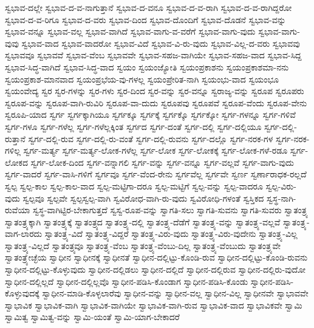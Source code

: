 {ಸ್ವಭಾವ-ದಲ್ಲೇ
ಸ್ವಭಾವ-ದ-ವ-ನಾಗುತ್ತಾನೆ
ಸ್ವಭಾವ-ದ-ವನೂ
ಸ್ವಭಾವ-ದ-ವ-ರಾಗಿ
ಸ್ವಭಾವ-ದ-ವ-ರಾಗಿದ್ದರೋ
ಸ್ವಭಾವ-ದ-ವ-ರಿಗೂ
ಸ್ವಭಾವ-ದ-ವರು
ಸ್ವಭಾವ-ದಿಂದ
ಸ್ವಭಾವ-ದೊಂದಿಗೆ
ಸ್ವಭಾವ-ದೊಡನೆ
ಸ್ವಭಾವ-ವನ್ನು
ಸ್ವಭಾವ-ವನ್ನೂ
ಸ್ವಭಾವ-ವಲ್ಲ
ಸ್ವಭಾವ-ವಾಗಿದೆ
ಸ್ವಭಾವ-ವಾಗು-ವ-ವರೆಗೆ
ಸ್ವಭಾವ-ವಾಗು-ವುದು
ಸ್ವಭಾವ-ವಾಗು-ವುವು
ಸ್ವಭಾವ-ವಾದ
ಸ್ವಭಾವ-ವಾದರೋ
ಸ್ವಭಾವ-ವಿದೆ
ಸ್ವಭಾವ-ವಿ-ರು-ವುದು
ಸ್ವಭಾವ-ವಿಲ್ಲ-ದ-ವರು
ಸ್ವಭಾವವು
ಸ್ವಭಾವವೂ
ಸ್ವಭಾವವೆ
ಸ್ವಭಾವ-ವೆಂಬ
ಸ್ವಭಾವವೇ
ಸ್ವಭಾವ-ಸಹಜ-ವಾಗಿಯೇ
ಸ್ವಭಾವ-ಸಹಜ-ವಾದ
ಸ್ವಭಾವ-ಸಿದ್ದ
ಸ್ವಭಾವ-ಸಿದ್ಧ-ವಾಗಿದೆ
ಸ್ವಭಾವ-ಸಿದ್ಧ-ವಾದ
ಸ್ವಯಂ
ಸ್ವಯಂಜ್ಯೋತಿ
ಸ್ವಯಂಪ್ರಕಾಶನು
ಸ್ವಯಂಪ್ರಕಾಶಮಾ-ನನು
ಸ್ವಯಂಪ್ರಕಾಶ-ಮಾನವಾದ
ಸ್ವಯಂಪ್ರಭೆಯ-ವು-ಗಳಲ್ಲ
ಸ್ವಯಂಪ್ರೇರಿತ-ನಾಗಿ
ಸ್ವಯಂಭು-ವಾದ
ಸ್ವಯಂಭೂ
ಸ್ವಯಂವೇದ್ಯ
ಸ್ವರ
ಸ್ವರ-ಗಳನ್ನು
ಸ್ವರ-ಗಳು
ಸ್ವರ-ದಿಂದ
ಸ್ವರ-ವನ್ನು
ಸ್ವರ-ವನ್ನೂ
ಸ್ವರಾಜ್ಯ-ವನ್ನು
ಸ್ವರೂಪ
ಸ್ವರೂಪರು
ಸ್ವರೂಪ-ವನ್ನು
ಸ್ವರೂಪ-ವಾಗಿ-ರುವಿರಿ
ಸ್ವರೂಪ-ವಾ-ದುದು
ಸ್ವರೂಪವು
ಸ್ವರೂಪವೆ
ಸ್ವರೂಪ-ವೆಂದು
ಸ್ವರೂಪ-ವೇನು
ಸ್ವರೂಪಿ-ಯಾದ
ಸ್ವರ್ಗ
ಸ್ವರ್ಗಕ್ಕಾಗಿಯೂ
ಸ್ವರ್ಗಕ್ಕೂ
ಸ್ವರ್ಗಕ್ಕೆ
ಸ್ವರ್ಗಕ್ಕೊ
ಸ್ವರ್ಗಕ್ಕೋ
ಸ್ವರ್ಗ-ಗಳನ್ನೂ
ಸ್ವರ್ಗ-ಗಳಿವೆ
ಸ್ವರ್ಗ-ಗಳೂ
ಸ್ವರ್ಗ-ಗಳೆಲ್ಲ
ಸ್ವರ್ಗ-ಗಳೆಲ್ಲಕ್ಕಿಂತ
ಸ್ವರ್ಗದ
ಸ್ವರ್ಗ-ದಂತೆ
ಸ್ವರ್ಗ-ದಲ್ಲಿ
ಸ್ವರ್ಗ-ದಲ್ಲಿಯೂ
ಸ್ವರ್ಗ-ದಲ್ಲಿ-ರುತ್ತಾನೆ
ಸ್ವರ್ಗ-ದಲ್ಲಿ-ರುವ
ಸ್ವರ್ಗ-ದಲ್ಲಿ-ರು-ವಂತೆ
ಸ್ವರ್ಗ-ದಲ್ಲಿ-ರುವನು
ಸ್ವರ್ಗ-ದಲ್ಲೊ
ಸ್ವರ್ಗ-ನರಕ-ಗಳ
ಸ್ವರ್ಗ-ನರಕ-ಗಳಿಲ್ಲ
ಸ್ವರ್ಗ-ಮರ್ತ್ಯ
ಸ್ವರ್ಗ-ಮರ್ತ್ಯ-ಲೋಕ-ಗಳೆಲ್ಲ
ಸ್ವರ್ಗ-ಲೋಕ
ಸ್ವರ್ಗ-ಲೋಕಕ್ಕೆ
ಸ್ವರ್ಗ-ಲೋಕ-ಗಳೆ-ರಡೂ
ಸ್ವರ್ಗ-ಲೋಕದ
ಸ್ವರ್ಗ-ಲೋಕ-ದಿಂದ
ಸ್ವರ್ಗ-ವನ್ನಾಗಲಿ
ಸ್ವರ್ಗ-ವನ್ನು
ಸ್ವರ್ಗ-ವನ್ನೂ
ಸ್ವರ್ಗ-ವಲ್ಲವೆ
ಸ್ವರ್ಗ-ವಾಗು-ವುದು
ಸ್ವರ್ಗ-ವಾದರೆ
ಸ್ವರ್ಗ-ವಾಸಿ-ಗಳಿಗೆ
ಸ್ವರ್ಗವೂ
ಸ್ವರ್ಗ-ವೆಂದ-ರೇನು
ಸ್ವರ್ಗವೆಲ್ಲ
ಸ್ವರ್ಗವೇ
ಸ್ವರ್ಣ
ಸ್ವರ್ಣಾರಾಧಕ-ರಲ್ಲದೆ
ಸ್ವಲ್ಪ
ಸ್ವಲ್ಪ-ಕಾಲ
ಸ್ವಲ್ಪ-ಕಾಲ-ವಾದ
ಸ್ವಲ್ಪ-ಮಟ್ಟಿಗಾ-ದರೂ
ಸ್ವಲ್ಪ-ಮಟ್ಟಿಗೆ
ಸ್ವಲ್ಪ-ವನ್ನು
ಸ್ವಲ್ಪ-ವಾದರೂ
ಸ್ವಲ್ಪ-ವಿರು-ವುದು
ಸ್ವಲ್ಪವೂ
ಸ್ವಲ್ಪವೇ
ಸ್ವಲ್ಪಸ್ವಲ್ಪ-ವಾಗಿ
ಸ್ವವಿರೋಧ-ವಾಗಿ-ರು-ವುದು
ಸ್ವವಿರೋಧಿ-ಗಳಂತೆ
ಸ್ವಸ್ತಿಕದ
ಸ್ವಸ್ಥ-ನಾಗಿ-ರುವೆಯಾ
ಸ್ವಸ್ಥ-ವಾಗಿಟ್ಟಿರ-ಬೇಕಾಗುತ್ತದೆ
ಸ್ವಸ್ವ-ರೂಪ-ವನ್ನು
ಸ್ವಾಗತಿ-ಸಲು
ಸ್ವಾಗತಿ-ಸುವನು
ಸ್ವಾಗತಿ-ಸುವರು
ಸ್ವಾತಂತ್ರ್ಯ
ಸ್ವಾತಂತ್ರ್ಯಕ್ಕಾಗಿ
ಸ್ವಾತಂತ್ರ್ಯಕ್ಕೆ
ಸ್ವಾತಂತ್ರ್ಯದ
ಸ್ವಾತಂತ್ರ್ಯ-ದಲ್ಲಿ
ಸ್ವಾತಂತ್ರ್ಯ-ದೆಡೆಗೆ
ಸ್ವಾತಂತ್ರ್ಯ-ವನ್ನು
ಸ್ವಾತಂತ್ರ್ಯ-ವಲ್ಲವೆ
ಸ್ವಾತಂತ್ರ್ಯ-ವಾಗ-ಲಾರದು
ಸ್ವಾತಂತ್ರ್ಯ-ವಿದೆ
ಸ್ವಾತಂತ್ರ್ಯ-ವಿದ್ದರೆ
ಸ್ವಾತಂತ್ರ್ಯ-ವಿರು-ವುದು
ಸ್ವಾತಂತ್ರ್ಯ-ವಿರು-ವುದೇನು
ಸ್ವಾತಂತ್ರ್ಯ-ವಿಲ್ಲ
ಸ್ವಾತಂತ್ರ್ಯ-ವಿಲ್ಲದೆ
ಸ್ವಾತಂತ್ರ್ಯವೂ
ಸ್ವಾತಂತ್ರ್ಯ-ವೆಂಬ
ಸ್ವಾತಂತ್ರ್ಯ-ವೆಂಬು-ದಿಲ್ಲ
ಸ್ವಾತಂತ್ರ್ಯ-ವೆಂಬುದು
ಸ್ವಾತಂತ್ರ್ಯವೇ
ಸ್ವಾತಂತ್ರ್ಯೇಚ್ಛೆಯ
ಸ್ವಾಧೀನ
ಸ್ವಾಧೀನಕ್ಕೆ
ಸ್ವಾಧೀನತೆ
ಸ್ವಾಧೀನ-ದಲ್ಲಿಟ್ಟು-ಕೊಂಡಿ-ರುವ
ಸ್ವಾಧೀನ-ದಲ್ಲಿಟ್ಟು-ಕೊಂಡಿ-ರುವನು
ಸ್ವಾಧೀನ-ದಲ್ಲಿಟ್ಟು-ಕೊಳ್ಳುವುದು
ಸ್ವಾಧೀನ-ದಲ್ಲಿಡಲು
ಸ್ವಾಧೀನ-ದಲ್ಲಿದೆ
ಸ್ವಾಧೀನ-ದಲ್ಲಿರುವ
ಸ್ವಾಧೀನ-ದಲ್ಲಿರು-ವುದೋ
ಸ್ವಾಧೀನ-ದಲ್ಲಿಲ್ಲದೆ
ಸ್ವಾಧೀನ-ದಲ್ಲಿಲ್ಲವೊ
ಸ್ವಾಧೀನ-ಪಡಿಸಿ-ಕೊಂಡಾಗ
ಸ್ವಾಧೀನ-ಪಡಿಸಿ-ಕೊಂಡು
ಸ್ವಾಧೀನ-ಪಡಿಸಿ-ಕೊಳ್ಳುವುದಕ್ಕೆ
ಸ್ವಾಧೀನ-ಮಾಡಿ-ಕೊಳ್ಳಲಾರೆವು
ಸ್ವಾಧೀನ-ವನ್ನು
ಸ್ವಾಧೀನ-ವಲ್ಲ
ಸ್ವಾಧೀನ-ವಿಲ್ಲ
ಸ್ವಾಧೀನವೇ
ಸ್ವಾಭಾವವೇ
ಸ್ವಾಭಾವಿಕ
ಸ್ವಾಭಾವಿಕ-ವಾಗಿ
ಸ್ವಾಭಾವಿಕ-ವಾಗಿಯೇ
ಸ್ವಾಭಾವಿಕ-ವಾಗಿ-ರುವ
ಸ್ವಾಭಾವಿಕ-ವಾದ
ಸ್ವಾಭಾವಿಕವೇ
ಸ್ವಾಮಿ
ಸ್ವಾಮಿತ್ವ
ಸ್ವಾಮಿತ್ವ-ವನ್ನು
ಸ್ವಾಮಿ-ಯಂತೆ
ಸ್ವಾಮಿ-ಯಾಗ-ಬೇಕಾದರೆ
}
